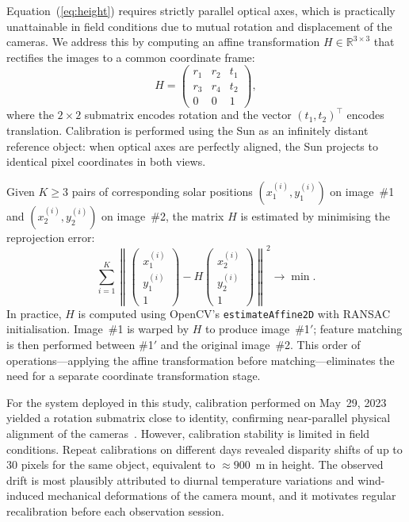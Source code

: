 \documentclass[preprint,
superscriptaddress,
amsmath,amssymb,aps,
twoside,final,secnumarabic,
nofootinbib]{revtex4-2}
\begin{document}
Equation~(\ref{eq:height}) requires strictly parallel optical axes, which is practically unattainable in field conditions due to mutual rotation and displacement of the cameras. We address this by computing an affine transformation $H \in \mathbb{R}^{3 \times 3}$ that rectifies the images to a common coordinate frame:
\begin{equation}
H = \begin{pmatrix} r_1 & r_2 & t_1 \\ r_3 & r_4 & t_2 \\ 0 & 0 & 1 \end{pmatrix},
\end{equation}
where the $2 \times 2$ submatrix encodes rotation and the vector $(t_1, t_2)^\top$ encodes translation. Calibration is performed using the Sun as an infinitely distant reference object: when optical axes are perfectly aligned, the Sun projects to identical pixel coordinates in both views.

Given $K \ge 3$ pairs of corresponding solar positions $(x_1^{(i)}, y_1^{(i)})$ on image~\#1 and $(x_2^{(i)}, y_2^{(i)})$ on image~\#2, the matrix $H$ is estimated by minimising the reprojection error:
\begin{equation}
\sum_{i=1}^{K} \left\| \begin{pmatrix} x_1^{(i)} \\ y_1^{(i)} \\ 1 \end{pmatrix} - H \begin{pmatrix} x_2^{(i)} \\ y_2^{(i)} \\ 1 \end{pmatrix} \right\|^2 \to \min.
\end{equation}
In practice, $H$ is computed using OpenCV's \texttt{estimateAffine2D} with RANSAC initialisation. Image~\#1 is warped by $H$ to produce image~\#1$'$; feature matching is then performed between \#1$'$ and the original image~\#2. This order of operations---applying the affine transformation before matching---eliminates the need for a separate coordinate transformation stage.

For the system deployed in this study, calibration performed on May~29, 2023 yielded a rotation submatrix close to identity, confirming near-parallel physical alignment of the cameras~\cite{3,4}. However, calibration stability is limited in field conditions. Repeat calibrations on different days revealed disparity shifts of up to 30 pixels for the same object, equivalent to $\approx 900$~m in height. The observed drift is most plausibly attributed to diurnal temperature variations and wind-induced mechanical deformations of the camera mount, and it motivates regular recalibration before each observation session.
\end{document}
